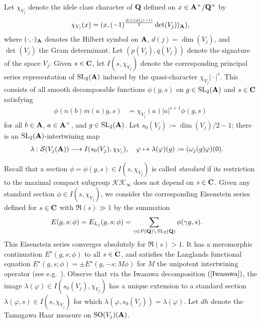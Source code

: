 \documentclass{amsart}
\theoremstyle{definition}
\begin{document}
Let $\chi_{V_j}$ denote the idele class character of ${\bf{Q}}$ defined on $x \in {\bf{A}}^{\times} / {\bf{Q}}^{\times}$ by  
\begin{align*} \chi_{V_j} (x) = (x, (-1)^{ \frac{ d(j)(d(j)-1) }{2}  } \det(V_j))_{\bf{A}}), \end{align*}
where $(\cdot, \cdot)_{\bf{A}}$ denotes the Hilbert symbol on ${\bf{A}}$, $d(j) = \dim(V_j)$, and $\det(V_j)$ the Gram determinant. 
Let $(p(V_j), q(V_j))$ denote the signature of the space $V_j$.
Given $s \in {\bf{C}}$, let $I(s, \chi_{V_j})$ denote the corresponding principal series representation 
of $\operatorname{SL}_2({\bf{A}})$ induced by the quasi-character $\chi_{V_j} \vert \cdot \vert^s$. 
This consists of all smooth decomposable functions 
$\phi(g, s)$ on $g \in \operatorname{SL}_2({\bf{A}})$ and $s \in {\bf{C}}$ satisfying 
\begin{align*} \phi( n(b)m(a) g, s ) &= \chi_{V_j}(a) \vert a \vert^{s+1} \phi(g, s)   \end{align*} 
for all $b \in {\bf{A}}$, $a \in {\bf{A}}^{\times}$, and $g \in \operatorname{SL}_2({\bf{A}})$. 
Let $s_0(V_j) := \dim(V_j)/2 - 1$; there is an $\operatorname{SL}_2({\bf{A}})$-intertwining map 
\begin{align*} \lambda: \mathcal{S}(V_j({\bf{A}})) &\longrightarrow I(s_0(V_j), \chi_{V_j}), \quad 
\varphi \mapsto \lambda(\varphi)(g) := (\omega_j(g) \varphi)(0). \end{align*}

Recall that a section $\phi = \phi(g, s) \in I(s, \chi_{V_j})$ is called {\it{standard}} if its restriction to the maximal compact subgroup 
$\mathcal{K} \mathcal{K}_{\infty}$ does not depend on $s \in {\bf{C}}$. 
Given any standard section $\phi \in I(s, \chi_{V_j})$, we consider the corresponding 
Eisenstein series defined for $s\in {\bf{C}}$ with $\Re(s) \gg 1$ by the summation
\begin{align*} E(g, s; \phi ) = E_{L_j}(g, s; \phi) 
&= \sum\limits_{ \gamma \in P( {\bf{Q}} ) \backslash \operatorname{SL}_2({\bf{Q}})} \phi(\gamma g, s). \end{align*}
This Eisenstein series converges absolutely for $\Re(s) >1$. It has a meromorphic continuation $E^{\star}(g,s; \phi)$
to all $s \in {\bf{C}}$, and satisfies the Langlands functional equation $E^{\star}(g, s; \phi) = \pm E^{\star}(g, -s; M \phi)$ 
for $M$ the unipotent intertwining operator (see e.g.~\cite[$\S 3$]{Bu}). 
Observe that via the Iwasawa decomposition $(\ref{Iwasawa})$, the image $\lambda(\varphi) \in I(s_0(V_j), \chi_{V_j})$ 
has a unique extension to a standard section $\lambda(\varphi, s) \in I(s, \chi_{V_j})$ for which $\lambda(\varphi, s_0(V_j)) = \lambda(\varphi)$.
Let $dh$ denote the Tamagawa Haar measure on $\operatorname{SO}(V_j)({\bf{A}})$. 
\end{document}
